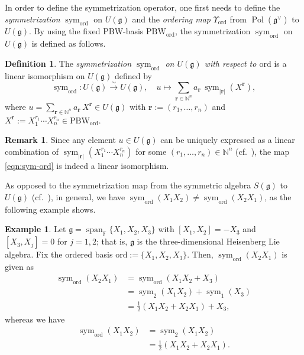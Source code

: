 \documentclass[a4paper,11pt,reqno]{amsart}
\newcommand{\frakg}{\mathfrak{g}}
\newcommand{\NN}{\mathbb{N}}
\newcommand{\0}{{\bf 0}}
\newcommand{\F}{\mathbb{F}}
\newcommand{\1}{{\bf 1}}
\DeclareMathOperator{\Span}{span}
\DeclareMathOperator{\Pol}{Pol}
\newcommand{\ord}{{\mathrm{ord}}}
\DeclareMathOperator{\To}{\longrightarrow}
\DeclareMathOperator{\sym}{sym}
\theoremstyle{plain}
\theoremstyle{definition}
\newtheorem{definition}[equation]{Definition}
\newtheorem{example}[equation]{Example}
\newtheorem{remark}[equation]{Remark}
\numberwithin{equation}{section}
\theoremstyle{definition}
\begin{document}
In order to define the symmetrization operator, one first needs to define
the \emph{symmetrization} $\sym_{\ord}$ on $U(\frakg)$ and the
\emph{ordering map} $\Upsilon_\ord$ from $\Pol(\frakg^\vee)$ to $U(\frakg)$.
By using the fixed PBW-basis $\mathrm{PBW}_\ord$,
the symmetrization $\sym_{\ord}$ on $U(\frakg)$ is defined as follows.

\begin{definition}
The  \emph{symmetrization $\sym_{\ord}$ on $U(\frakg)$ with respect to 
$\ord$} is a linear isomorphism on $U(\frakg)$ defined by
\begin{equation}\label{eqn:sym-ord}
\sym_{\ord}\colon U(\frakg) \stackrel{\sim}{\To} U(\frakg),
\quad
u\longmapsto
\sum_{\mathbf{r} \in \NN^n} 
a_\mathbf{r}\, \sym_{|\mathbf{r}|}(X^{\mathbf{r}}),
\end{equation}
where  $u=\sum_{\mathbf{r} \in \NN^n} 
a_\mathbf{r}\, X^{\mathbf{r}} \in U(\frakg)$
with $\mathbf{r} :=(r_1,\ldots, r_n)$ and 
$X^{\mathbf{r}} := X_1^{r_1}\cdots X_n^{r_n}\in \mathrm{PBW}_\ord$.
\end{definition}

\begin{remark}
Since any element $u \in U(\frakg)$ can be uniquely expressed 
as a linear combination of  
$\sym_{|\mathbf{r}|}(X_1^{r_1}\cdots X_n^{r_n})$ 
for some $(r_1,\dots, r_n) \in \NN^n$ (cf.\ \cite[p.\ 225]{Knapp02}), 
the map \eqref{eqn:sym-ord} is indeed  a linear isomorphism.
\end{remark}

As opposed to the symmetrization map
from the symmetric algebra $S(\frakg)$ to $U(\frakg)$ (cf.\ \cite[p.\ 225]{Knapp02}), 
in general, we have $\sym_{\ord}(X_1X_2) \neq \sym_{\ord}(X_2X_1)$, 
as the following example shows.

\begin{example}\label{example:symmetrization}
Let $\mathfrak{g}=\Span_\F\{X_1, X_2, X_3\}$ 
with $[X_1, X_2]=-X_3$ and $[X_3, X_j]=0$ for $j=1,2$;
that is,
$\frakg$ is the three-dimensional Heisenberg Lie algebra.
Fix the ordered basis $\ord:=\{X_1, X_2, X_3\}$.
Then, $\sym_\ord(X_2X_1)$ is given  as
\begin{align*}
\sym_\ord(X_2X_1)
&=\sym_\ord(X_1X_2+X_3)\\
&=\sym_2(X_1X_2)+\sym_1(X_3) \\
&= \frac{1}{2}(X_1X_2+X_2X_1) + X_3,
\end{align*}
whereas we have 
\begin{align*}
\sym_\ord(X_1X_2)
&=\sym_2(X_1X_2)\\
&= \frac{1}{2}(X_1X_2+X_2X_1).
\end{align*}
\end{example}
\end{document}
